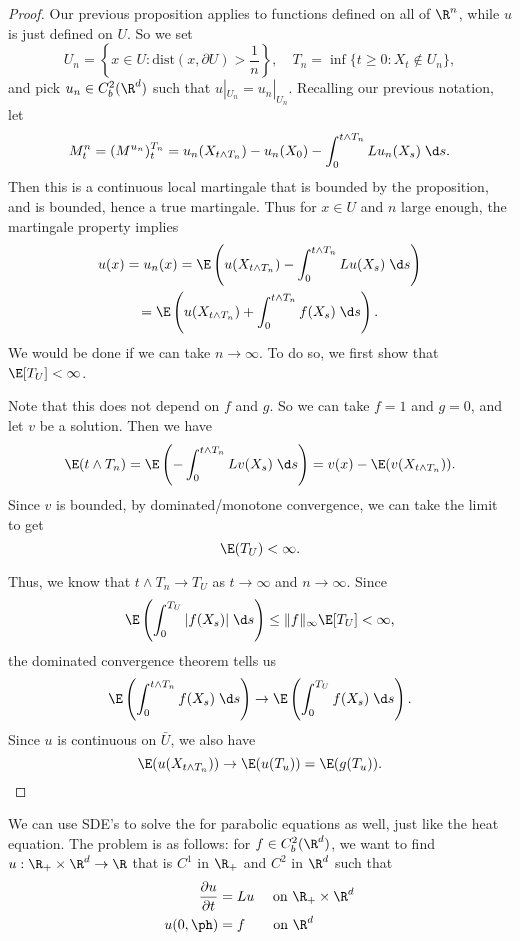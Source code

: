 \documentclass[a4paper]{article}
\begin{document}
\begin{proof}
  Our previous proposition applies to functions defined on all of $\R^n$, while $u$ is just defined on $U$. So we set
  \[
    U_n = \left\{x \in U: \mathrm{dist}(x, \partial U) > \frac{1}{n}\right\},\quad T_n = \inf \{ t \geq 0 : X_t \not \in U_n\},
  \]
  and pick $u_n \in C_b^2(\R^d)$ such that $u|_{U_n} = u_n|_{U_n}$. Recalling our previous notation, let
  \[
    M^n_t = (M^{u_n})^{T_n}_t = u_n(X_{t \wedge T_n}) - u_n(X_0) - \int_0^{t \wedge T_n} Lu_n(X_s)\;\d s.
  \]
  Then this is a continuous local martingale that is bounded by the proposition, and is bounded, hence a true martingale. Thus for $x \in U$ and $n$ large enough, the martingale property implies
  \begin{multline*}
    u(x) = u_n(x) =\E \left(u(X_{t \wedge T_n}) - \int_0^{t \wedge T_n} Lu(X_s)\;\d s\right) \\
    = \E \left(u(X_{t \wedge T_n}) + \int_0^{t \wedge T_n} f(X_s)\;\d s\right).
  \end{multline*}
  We would be done if we can take $n \to \infty$. To do so, we first show that $\E [T_U] < \infty$.
  
  Note that this does not depend on $f$ and $g$. So we can take $f = 1$ and $g = 0$, and let $v$ be a solution. Then we have
  \[
    \E (t \wedge T_n) = \E \left(- \int_0^{t \wedge T_n} Lv(X_s)\;\d s\right) = v(x) - \E(v(X_{t \wedge T_n})).
  \]
  Since $v$ is bounded, by dominated/monotone convergence, we can take the limit to get
  \[
    \E (T_U) < \infty.
  \]

  Thus, we know that  $t \wedge T_n \to T_U$ as $t \to \infty$ and $n \to \infty$. Since
  \[
    \E \left(\int_0^{T_U} |f(X_s)|\;\d s\right) \leq \|f\|_\infty \E[T_U] < \infty,
  \]
  the dominated convergence theorem tells us
  \[
    \E \left(\int_0^{t \wedge T_n} f(X_s)\;\d s \right) \to \E \left(\int_0^{T_U} f(X_s)\;\d s\right).
  \]
  Since $u$ is continuous on $\bar{U}$, we also have
  \[
    \E (u(X_{t \wedge T_n})) \to \E(u(T_u)) = \E(g(T_u)).\qedhere
  \]
\end{proof}

We can use SDE's to solve the  for parabolic equations as well, just like the heat equation. The problem is as follows: for $f \in C_b^2(\R^d)$, we want to find $u: \R_+ \times \R^d \to \R$ that is $C^1$ in $\R_+$ and $C^2$ in $\R^d$ such that
\begin{align*}
  \frac{\partial u}{\partial t} &= Lu \quad \text{ on }\R_+ \times \R^d\\
  u(0, \ph) &= f\hphantom{L} \quad \text{ on }\R^d
\end{align*}
\end{document}
